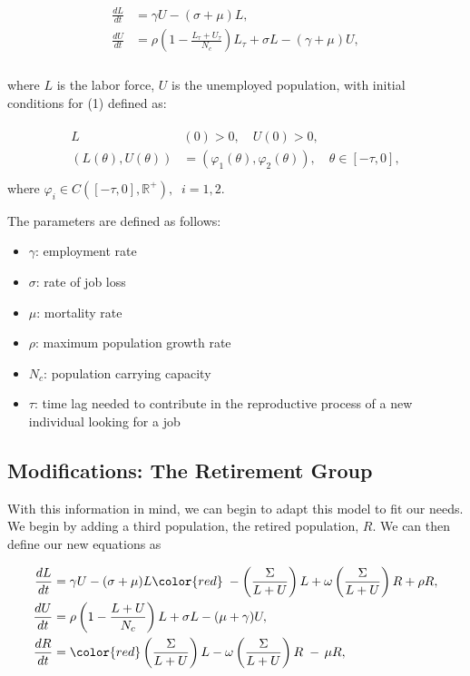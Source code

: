 \documentclass[11pt]{amsart}
\begin{document}
\begin{align}
    \begin{split}
        \frac{dL}{dt} &= \gamma U - (\sigma + \mu)L, \\
        \frac{dU}{dt} &= \rho \left(1 - \frac{L_{\tau} + U_{\tau}}{N_c} \right)L_{\tau} + \sigma L - (\gamma + \mu)U, \\
    \end{split}
\end{align}

where $L$ is the labor force, $U$ is the unemployed population, with initial conditions for (1) defined as:

\begin{align}
    \begin{split}
        L&(0) > 0, \quad U(0) > 0, \\
        (L(\theta),U(\theta)) &= (\varphi_1(\theta), \varphi_2(\theta)), \quad \theta \in [-\tau,0], \\
    \end{split}
\end{align}
where $\varphi_i\in C([-\tau, 0], \mathbb{R}^+),\;\; i=1,2$.

The parameters are defined as follows:

\begin{itemize}
    \item $\gamma$: employment rate
    \item $\sigma$: rate of job loss 
    \item $\mu$: mortality rate
    \item $\rho$: maximum population growth rate 
    \item $N_c$: population carrying capacity 
    \item $\tau$: time lag needed to contribute in the reproductive process of a new individual looking for a job
\end{itemize}

\subsection{Modifications: The Retirement Group}
 

With this information in mind, we can begin to adapt this model to fit our needs. We begin by adding a third population, the retired population, $R$.
We can then define our new equations as

\begin{align}
    \begin{split}
        \frac{dL}{dt} &= \gamma U - (\sigma + \mu)L {\color{red}\;- \left(\frac{\Sigma}{L + U}\right) L + \omega\left(\frac{\Sigma}{L + U}\right) R + \rho R},\\
        \frac{dU}{dt} &= \rho\left(1 - \frac{L + U}{N_c} \right)L + \sigma L -(\mu + \gamma)U,  \\
        \frac{dR}{dt} &= {\color{red}\left(\frac{\Sigma}{L + U}\right) L - \omega\left(\frac{\Sigma}{L + U}\right) R \; - \, \mu R},
    \end{split}
\end{align}
\end{document}
